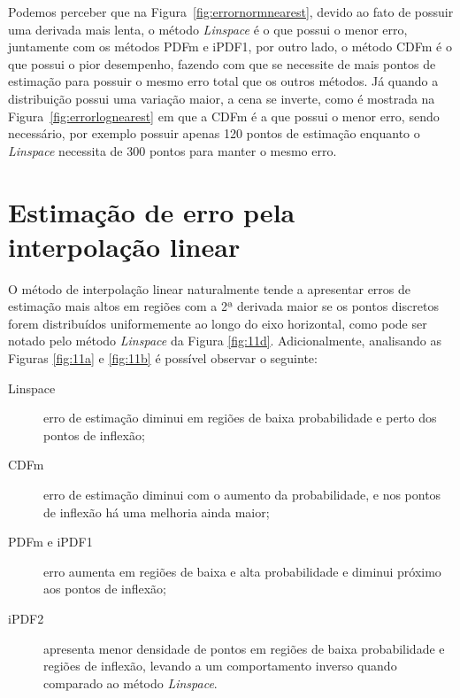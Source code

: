 Podemos perceber que na Figura~\ref{fig:errornormnearest}, devido ao fato de possuir uma derivada mais lenta, o método \textit{Linspace} é o que possui o menor erro, juntamente com os métodos \ac{PDFm} e \ac{iPDF1}, por outro lado, o método \ac{CDFm} é o que possui o pior desempenho, fazendo com que se necessite de mais pontos de estimação para possuir o mesmo erro total que os outros métodos. Já quando a distribuição possui uma variação maior, a cena se inverte, como é mostrada na Figura~\ref{fig:errorlognearest} em que a \ac{CDFm} é a que possui o menor erro, sendo necessário, por exemplo possuir apenas 120 pontos de estimação enquanto o \textit{Linspace} necessita de 300 pontos para manter o mesmo erro.


\section{Estimação de erro pela interpolação linear} \label{cap:interp_lin}

O método de interpolação linear naturalmente tende a apresentar erros de estimação mais altos em regiões com a 2ª derivada maior se os pontos discretos forem distribuídos uniformemente ao longo do eixo horizontal, como pode ser notado pelo método \textit{Linspace} da Figura \ref{fig:11d}. Adicionalmente, analisando as Figuras \ref{fig:11a} e \ref{fig:11b} é possível observar o seguinte:

\begin{description}
	\item[Linspace] erro de estimação diminui em regiões de baixa probabilidade e perto dos pontos de inflexão;
	\item[CDFm] erro de estimação diminui com o aumento da probabilidade, e nos pontos de inflexão há uma melhoria ainda maior;
	\item [PDFm e iPDF1] erro aumenta em regiões de baixa e alta probabilidade e diminui próximo aos pontos de inflexão;
	\item[iPDF2] apresenta menor densidade de pontos em regiões de baixa probabilidade e regiões de inflexão, levando a um comportamento inverso quando comparado ao método \textit{Linspace}.
\end{description}   

